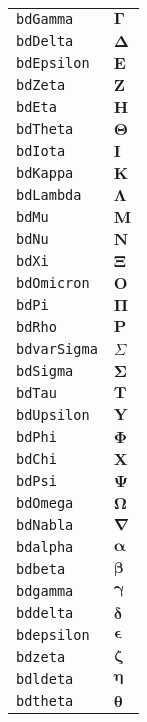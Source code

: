 \begin{longtable}{ll}
\texttt{bdGamma}&${}\boldsymbol{\Gamma} {}$\\
\texttt{bdDelta}&${}\boldsymbol{\Delta} {}$\\
\texttt{bdEpsilon}&${}\boldsymbol{E} {}$\\
\texttt{bdZeta}&${}\boldsymbol{Z} {}$\\
\texttt{bdEta}&${}\boldsymbol{H} {}$\\
\texttt{bdTheta}&${}\boldsymbol{\Theta} {}$\\
\texttt{bdIota}&${}\boldsymbol{I} {}$\\
\texttt{bdKappa}&${}\boldsymbol{K} {}$\\
\texttt{bdLambda}&${}\boldsymbol{\Lambda} {}$\\
\texttt{bdMu}&${}\boldsymbol{M} {}$\\
\texttt{bdNu}&${}\boldsymbol{N} {}$\\
\texttt{bdXi}&${}\boldsymbol{\Xi} {}$\\
\texttt{bdOmicron}&${}\boldsymbol{O} {}$\\
\texttt{bdPi}&${}\boldsymbol{\Pi} {}$\\
\texttt{bdRho}&${}\boldsymbol{P} {}$\\
\texttt{bdvarSigma}&${}\boldsymbol{\varSigma} {}$\\
\texttt{bdSigma}&${}\boldsymbol{\Sigma} {}$\\
\texttt{bdTau}&${}\boldsymbol{T} {}$\\
\texttt{bdUpsilon}&${}\boldsymbol{Y} {}$\\
\texttt{bdPhi}&${}\boldsymbol{\Phi} {}$\\
\texttt{bdChi}&${}\boldsymbol{X} {}$\\
\texttt{bdPsi}&${}\boldsymbol{\Psi} {}$\\
\texttt{bdOmega}&${}\boldsymbol{\Omega} {}$\\
\texttt{bdNabla}&${}\boldsymbol{\nabla} {}$\\
\texttt{bdalpha}&${}\boldsymbol{\alpha} {}$\\
\texttt{bdbeta}&${}\boldsymbol{\beta} {}$\\
\texttt{bdgamma}&${}\boldsymbol{\gamma} {}$\\
\texttt{bddelta}&${}\boldsymbol{\delta} {}$\\
\texttt{bdepsilon}&${}\boldsymbol{\epsilon} {}$\\
\texttt{bdzeta}&${}\boldsymbol{\zeta} {}$\\
\texttt{bdldeta}&${}\boldsymbol{\eta} {}$\\
\texttt{bdtheta}&${}\boldsymbol{\theta} {}$\\

\end{longtable}
